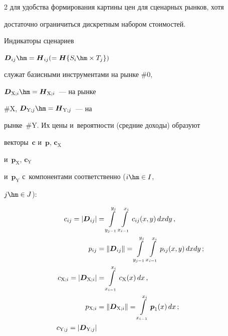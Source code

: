 \begin{multicols}{2}
для удобства формирования картины цен для сценарных рынков, хотя 


достаточно ограничиться дискретным набором стоимостей. 


  


  Индикаторы сценариев 


$\boldsymbol{D}_{ij}\hm = \boldsymbol{H}_{ij} (= \boldsymbol{H}\{S_i\hm\times T_j\})$ 


служат базисными инструментами на рынке \#0, 


$\boldsymbol{D}_{\mathrm{X};i}\hm = \boldsymbol{H}_{\mathrm{X};i}$~--- на рынке 


\#X, $\boldsymbol{D}_{\mathrm{Y};j}\hm = \boldsymbol{H}_{\mathrm{Y};j}$~--- на 


рынке~\#Y. Их цены и~вероятности (средние доходы) образуют 


векторы~$\boldsymbol{c}$ и~$\boldsymbol{p}$, $\boldsymbol{c}_{\mathrm{X}}$ 


и~$\boldsymbol{p}_{\mathrm{X}}$, $\boldsymbol{c}_{\mathrm{Y}}$ 


и~$\boldsymbol{p}_{\mathrm{Y}}$ с~компонентами соответственно ($i \hm\in I$, 


$j \hm\in J$):


  \begin{align*}


  c_{ij}=\left\vert  \boldsymbol{D}_{ij}\right\vert &= 


  \int\limits_{y_{j-1}}^{y_j} 


\int\limits^{x_i}_{x_{i-1}} c_{ij}(x,y)\,dxdy\,,\\


  p_{ij} &= \left\|  \boldsymbol{D}_{ij}\right\| = \int\limits_{y_{j-1}}^{y_j} 


\int\limits^{x_i}_{x_{i-1}} p_{ij}(x,y)\,dxdy\,;\\


  c_{\mathrm{X};i} =\left\vert \boldsymbol{D}_{\mathrm{X};i}\right\vert 


&=\int\limits_{x_{i-1}}^{x_i} {c}_{\mathrm{X}}(x)\,dx\,,\notag\\ 


  p_{\mathrm{X};i} &=\left\| \boldsymbol{D}_{\mathrm{X};i}\right\| 


=\int\limits_{x_{i-1}}^{x_i} \boldsymbol{p}_1(x)\,dx\,;%


\\


  c_{\mathrm{Y};j} =\left\vert \boldsymbol{D}_{\mathrm{Y};j}\right\vert 



\end{align*}
\end{multicols}
